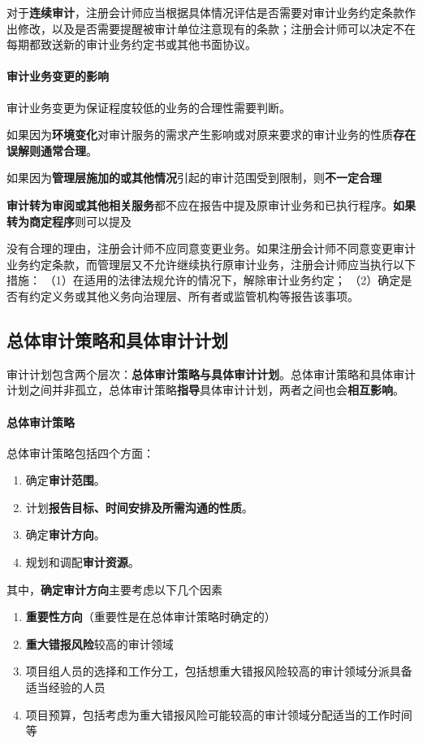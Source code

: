 \documentclass[UTF8,12pt]{ctexart}
\numberwithin{equation}{section} %
\numberwithin{figure}{section}
\numberwithin{table}{section}
\begin{document}
	对于\textbf{连续审计}，注册会计师应当根据具体情况评估是否需要对审计业务约定条款作出修改，以及是否需要提醒被审计单位注意现有的条款；注册会计师可以决定不在每期都致送新的审计业务约定书或其他书面协议。
	
	\paragraph{审计业务变更的影响}
	审计业务变更为保证程度较低的业务的合理性需要判断。
	
	如果因为\textbf{环境变化}对审计服务的需求产生影响或对原来要求的审计业务的性质\textbf{存在误解}\textbf{则通常合理}。
	
	如果因为\textbf{管理层施加的或其他情况}引起的审计范围受到限制，则\textbf{不一定合理}
	
	\textbf{审计转为审阅或其他相关服务}都不应在报告中提及原审计业务和已执行程序。\textbf{如果转为商定程序}则可以提及
	
	没有合理的理由，注册会计师不应同意变更业务。如果注册会计师不同意变更审计业务约定条款，而管理层又不允许继续执行原审计业务，注册会计师应当执行以下措施：
	（1）在适用的法律法规允许的情况下，解除审计业务约定；
	（2）确定是否有约定义务或其他义务向治理层、所有者或监管机构等报告该事项。
	
	
	\subsection{总体审计策略和具体审计计划}
	
	审计计划包含两个层次：\textbf{总体审计策略与具体审计计划}。总体审计策略和具体审计计划之间并非孤立，总体审计策略\textbf{指导}具体审计计划，两者之间也会\textbf{相互影响}。
	
	\paragraph{总体审计策略}
	总体审计策略包括四个方面：
	\begin{enumerate}
		\item 确定\textbf{审计范围}。
		
		\item 计划\textbf{报告目标、时间安排及所需沟通的性质}。
		
		\item 确定\textbf{审计方向}。
		
		\item 规划和调配\textbf{审计资源}。
	\end{enumerate}
	
	其中，\textbf{确定审计方向}主要考虑以下几个因素
	\begin{enumerate}
		\item \textbf{重要性方向}（重要性是在总体审计策略时确定的）
		
		\item \textbf{重大错报风险}较高的审计领域
		
		\item 项目组人员的选择和工作分工，包括想重大错报风险较高的审计领域分派具备适当经验的人员
		
		\item 项目预算，包括考虑为重大错报风险可能较高的审计领域分配适当的工作时间等
	\end{enumerate}
	
\end{document}
